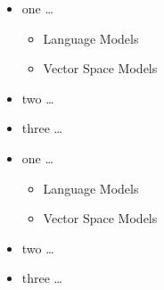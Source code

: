 \begin{itemize}
    \item one \dots{}
    \begin{itemize}
        \item Language Models
        \item Vector Space Models
    \end{itemize}
    \item two \dots{}
    \item three \dots{}
\end{itemize}

\begin{itemize}
    \item one \dots{}
    \begin{itemize}[label=$\star$]
        \item Language Models
        \item Vector Space Models
    \end{itemize}
    \item two \dots{}
    \item three \dots{}
\end{itemize}
